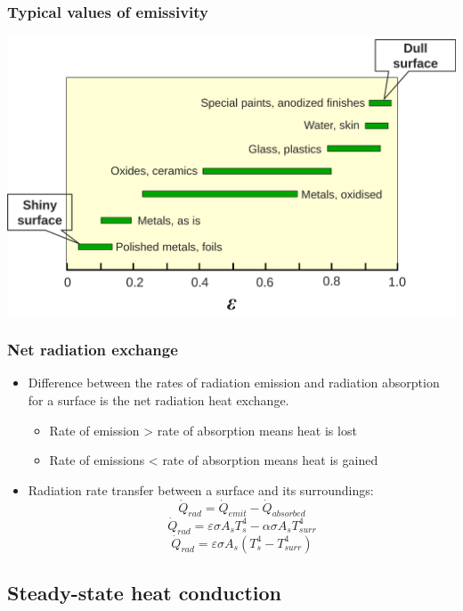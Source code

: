\documentclass[11pt]{article}
\begin{document}
\subsubsection{Typical values of emissivity}
\label{sec:org218901c}
\begin{center}
\includegraphics[width=.9\linewidth]{./images/typical-values-of-emissivity.png}
\end{center}
\subsubsection{Net radiation exchange}
\label{sec:org9795a02}
\begin{itemize}
\item Difference between the rates of radiation emission and radiation absorption for a surface is the net radiation heat exchange.
\begin{itemize}
\item Rate of emission > rate of absorption means heat is lost
\item Rate of emissions < rate of absorption means heat is gained
\end{itemize}
\item Radiation rate transfer between a surface and its surroundings:
\[\dot{Q}_{rad} = \dot{Q}_{emit} - \dot{Q}_{absorbed}\]
\[\dot{Q}_{rad} = \varepsilon \sigma A_s T_s^4 - \alpha \sigma A_s T_{surr}^4\]
\[\dot{Q}_{rad} = \varepsilon \sigma A_s \left(T_s^4 - T_{surr}^4 \right)\]
\end{itemize}

 \newpage
\subsection{Steady-state heat conduction}
\label{sec:orge551d28}
\end{document}
